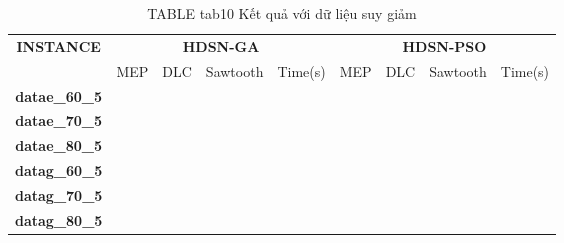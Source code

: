 \begin{table}{}
	\caption{TABLE tab10 Kết quả với dữ liệu suy giảm}
	\label{tab10}
	\centering
	\begin{tabular}{|c|c|c|c|c|c|c|c|c|}
		\hline
		\multirow{2}{*}{\textbf{INSTANCE}} & \multicolumn{4}{|c}{\textbf{HDSN-GA}} & \multicolumn{4}{|c|}{\textbf{HDSN-PSO}} \\ \cline{2-9}
		& MEP & DLC & Sawtooth & Time(s) & MEP & DLC & Sawtooth & Time(s) \\ \hline
		\textbf{datae\_60\_5} & & & & & & & & \\ \hline
		\textbf{datae\_70\_5} & & & & & & & & \\ \hline
		\textbf{datae\_80\_5} & & & & & & & & \\ \hline
		\textbf{datag\_60\_5} & & & & & & & & \\ \hline
		\textbf{datag\_70\_5} & & & & & & & & \\ \hline
		\textbf{datag\_80\_5} & & & & & & & & \\ \hline
	\end{tabular}
\end{table}
